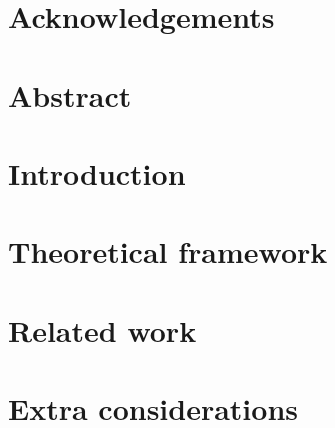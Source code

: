 \documentclass[10pt, letterpaper, twoside]{report}
\begin{document}


\chapter*{Acknowledgements}
\lipsum[1-1]

\chapter*{Abstract}


\tableofcontents
\listoffigures
\listoftables

\chapter{Introduction}


\chapter{Theoretical framework}


\chapter{Related work}



\appendix
\chapter{Extra considerations}



\end{document}
